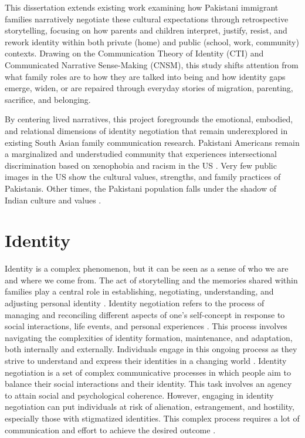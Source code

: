 This dissertation extends existing work examining how Pakistani immigrant families narratively negotiate these cultural expectations through retrospective storytelling, focusing on how parents and children interpret, justify, resist, and rework identity within both private (home) and public (school, work, community) contexts. Drawing on the Communication Theory of Identity (CTI) and Communicated Narrative Sense-Making (CNSM), this study shifts attention from what family roles are to how they are talked into being \citep{duckTalkingRelationshipsBeing1995} and how identity gaps emerge, widen, or are repaired through everyday stories of migration, parenting, sacrifice, and belonging.

By centering lived narratives, this project foregrounds the emotional, embodied, and relational dimensions of identity negotiation that remain underexplored in existing South Asian family communication research. Pakistani Americans remain a marginalized and understudied community that experiences intersectional discrimination based on xenophobia and racism in the US \citep{aghideh2020a}. Very few public images in the US show the cultural values, strengths, and family practices of Pakistanis. Other times, the Pakistani population falls under the shadow of Indian culture and values \citep{bashirUnderstandingContributingFactors2018}.


\section{Identity}

Identity is a complex phenomenon, but it can be seen as a sense of who we are and where we come from. The act of storytelling and the memories shared within families play a central role in establishing, negotiating, understanding, and adjusting personal identity \citep{barclayFamilyMemoryIdentity2021}. Identity negotiation refers to the process of managing and reconciling different aspects of one's self-concept in response to social interactions, life events, and personal experiences \citep{hecht2002ResearchOdyssey1993, jungElaboratingCommunicationTheory2004, kuiperBridgingGapsAdvancing2023, shinCommunicationTheoryIdentity2017}. This process involves navigating the complexities of identity formation, maintenance, and adaptation, both internally and externally. Individuals engage in this ongoing process as they strive to understand and express their identities in a changing world \citep{kuiperCommunicationTheoryIdentity2021, shinCommunicationTheoryIdentity2017}. Identity negotiation is a set of complex communicative processes in which people aim to balance their social interactions and their identity. This task involves an agency to attain social and psychological coherence. However, engaging in identity negotiation can put individuals at risk of alienation, estrangement, and hostility, especially those with stigmatized identities. This complex process requires a lot of communication and effort to achieve the desired outcome \citep{trinhUsingCommunicationTheory2023}.

